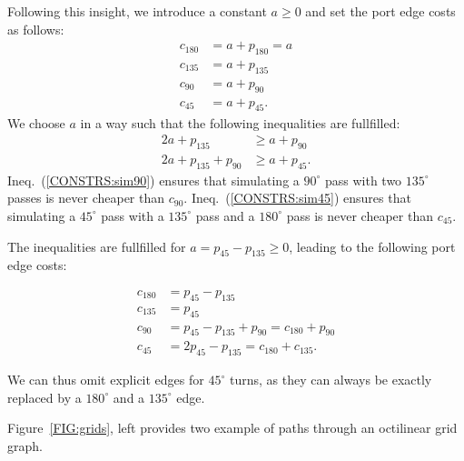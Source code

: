 \documentclass{sig-alternate-sigmod09}
\begin{document}
Following this insight, we introduce a constant $a \geq 0$ and set the port edge costs as follows:
\begin{align}
c_{180} &= a + p_{180} = a \\
c_{135} &= a + p_{135} \\
c_{90} &= a + p_{90} \\
c_{45} &= a + p_{45}.
\end{align}
We choose $a$ in a way such that the following inequalities are fullfilled:
\begin{align}
2a + p_{135} &\geq a + p_{90} \label{CONSTRS:sim90}\\
2a + p_{135} + p_{90} &\geq a + p_{45}\label{CONSTRS:sim45}.
\end{align}
Ineq.~(\ref{CONSTRS:sim90}) ensures that simulating a $90^{\circ}$ pass with two $135^{\circ}$ passes is never cheaper than $c_{90}$. Ineq.~(\ref{CONSTRS:sim45}) ensures that simulating a $45^{\circ}$ pass with a $135^{\circ}$ pass and a $180^{\circ}$ pass is never cheaper than $c_{45}$.

The inequalities are fullfilled for $a = p_{45} - p_{135} \geq 0$, leading to the following port edge costs:

\begin{align}
c_{180} &= p_{45} - p_{135} \\
c_{135} &= p_{45} \\
c_{90} &= p_{45} - p_{135} + p_{90} = c_{180} + p_{90} \\
c_{45} &= 2 p_{45} - p_{135} = c_{180} + c_{135}.
\end{align}

We can thus omit explicit edges for $45^{\circ}$ turns, as they can always be exactly replaced by a $180^{\circ}$ and a $135^{\circ}$ edge.

Figure~\ref{FIG:grids}, left provides two example of paths through an octilinear grid graph.
\end{document}
